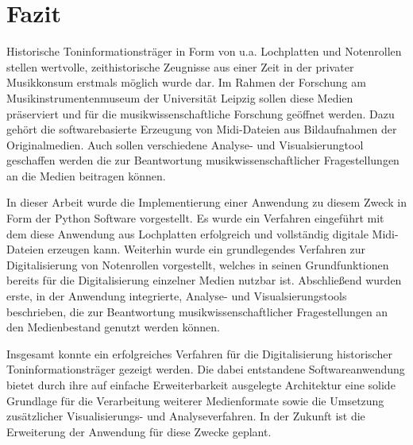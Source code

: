 \section{Fazit}

Historische Toninformationsträger in Form von u.a. Lochplatten und Notenrollen stellen wertvolle, zeithistorische Zeugnisse aus einer Zeit in der privater Musikkonsum erstmals möglich wurde dar.
Im Rahmen der Forschung am Musikinstrumentenmuseum der Universität Leipzig sollen diese Medien präserviert und für die musikwissenschaftliche Forschung geöffnet werden.
Dazu gehört die softwarebasierte Erzeugung von Midi-Dateien aus Bildaufnahmen der Originalmedien.
Auch sollen verschiedene Analyse- und Visualsierungtool geschaffen werden die zur Beantwortung musikwissenschaftlicher Fragestellungen an die Medien beitragen können.

In dieser Arbeit wurde die Implementierung einer Anwendung zu diesem Zweck in Form der Python Software  vorgestellt.
Es wurde ein Verfahren eingeführt mit dem diese Anwendung aus Lochplatten erfolgreich und vollständig digitale Midi-Dateien erzeugen kann.
Weiterhin wurde ein grundlegendes Verfahren zur Digitalisierung von Notenrollen vorgestellt, welches in seinen Grundfunktionen bereits für die Digitalisierung einzelner Medien nutzbar ist.
Abschließend wurden erste, in der Anwendung integrierte, Analyse- und Visualsierungstools beschrieben, die zur Beantwortung musikwissenschaftlicher Fragestellungen an den Medienbestand genutzt werden können.

Insgesamt konnte ein erfolgreiches Verfahren für die Digitalisierung historischer Toninformationsträger gezeigt werden.
Die dabei entstandene Softwareanwendung bietet durch ihre auf einfache Erweiterbarkeit ausgelegte Architektur eine solide Grundlage für die Verarbeitung weiterer Medienformate sowie die Umsetzung zusätzlicher Visualisierungs- und Analyseverfahren.
In der Zukunft ist die Erweiterung der Anwendung für diese Zwecke geplant.